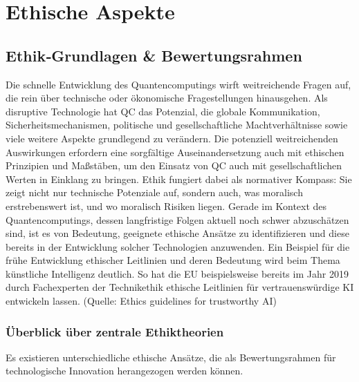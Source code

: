 \chapter{Ethische Aspekte}

\label{ethics} %



\section{\textbf{Ethik‑Grundlagen \& Bewertungsrahmen}}

Die schnelle Entwicklung des Quantencomputings wirft weitreichende Fragen auf, die rein über technische oder ökonomische Fragestellungen hinausgehen. Als disruptive Technologie hat QC das Potenzial, die globale Kommunikation, Sicherheitsmechanismen, politische und gesellschaftliche Machtverhältnisse sowie viele weitere Aspekte grundlegend zu verändern. Die potenziell weitreichenden Auswirkungen erfordern eine sorgfältige Auseinandersetzung auch mit ethischen Prinzipien und Maßstäben, um den Einsatz von QC auch mit gesellschaftlichen Werten in Einklang zu bringen. Ethik fungiert dabei als normativer Kompass: Sie zeigt nicht nur technische Potenziale auf, sondern auch, was moralisch erstrebenswert ist, und wo moralisch Risiken liegen. Gerade im Kontext des Quantencomputings, dessen langfristige Folgen aktuell noch schwer abzuschätzen sind, ist es von Bedeutung, geeignete ethische Ansätze zu identifizieren und diese bereits in der Entwicklung solcher Technologien anzuwenden. Ein Beispiel für die frühe Entwicklung ethischer Leitlinien und deren Bedeutung wird beim Thema künstliche Intelligenz deutlich. So hat die EU beispielsweise bereits im Jahr 2019 durch Fachexperten der Technikethik ethische Leitlinien für vertrauenswürdige KI entwickeln lassen. \cite{}
(Quelle: Ethics guidelines for trustworthy AI)

\subsection{Überblick über zentrale Ethiktheorien}

Es existieren unterschiedliche ethische Ansätze, die als Bewertungsrahmen für technologische Innovation herangezogen werden können. 


